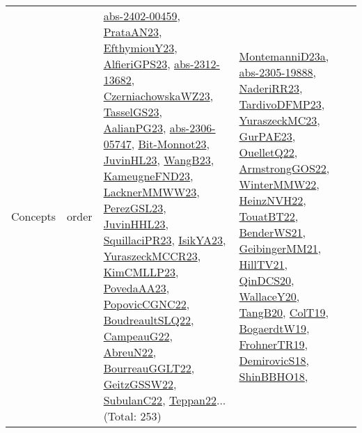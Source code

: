 {\begin{longtable}{lp{3cm}>{\raggedright}p{6cm}>{\raggedright}p{6cm}p{8cm}}
Concepts & order & \href{articles/abs-2402-00459.pdf}{abs-2402-00459}\cite{abs-2402-00459}, \href{articles/PrataAN23.pdf}{PrataAN23}\cite{PrataAN23}, \href{papers/EfthymiouY23.pdf}{EfthymiouY23}\cite{EfthymiouY23}, \href{articles/AlfieriGPS23.pdf}{AlfieriGPS23}\cite{AlfieriGPS23}, \href{articles/abs-2312-13682.pdf}{abs-2312-13682}\cite{abs-2312-13682}, \href{articles/CzerniachowskaWZ23.pdf}{CzerniachowskaWZ23}\cite{CzerniachowskaWZ23}, \href{papers/TasselGS23.pdf}{TasselGS23}\cite{TasselGS23}, \href{papers/AalianPG23.pdf}{AalianPG23}\cite{AalianPG23}, \href{articles/abs-2306-05747.pdf}{abs-2306-05747}\cite{abs-2306-05747}, \href{papers/Bit-Monnot23.pdf}{Bit-Monnot23}\cite{Bit-Monnot23}, \href{papers/JuvinHL23.pdf}{JuvinHL23}\cite{JuvinHL23}, \href{papers/WangB23.pdf}{WangB23}\cite{WangB23}, \href{papers/KameugneFND23.pdf}{KameugneFND23}\cite{KameugneFND23}, \href{articles/LacknerMMWW23.pdf}{LacknerMMWW23}\cite{LacknerMMWW23}, \href{papers/PerezGSL23.pdf}{PerezGSL23}\cite{PerezGSL23}, \href{papers/JuvinHHL23.pdf}{JuvinHHL23}\cite{JuvinHHL23}, \href{papers/SquillaciPR23.pdf}{SquillaciPR23}\cite{SquillaciPR23}, \href{articles/IsikYA23.pdf}{IsikYA23}\cite{IsikYA23}, \href{articles/YuraszeckMCCR23.pdf}{YuraszeckMCCR23}\cite{YuraszeckMCCR23}, \href{papers/KimCMLLP23.pdf}{KimCMLLP23}\cite{KimCMLLP23}, \href{papers/PovedaAA23.pdf}{PovedaAA23}\cite{PovedaAA23}, \href{papers/PopovicCGNC22.pdf}{PopovicCGNC22}\cite{PopovicCGNC22}, \href{papers/BoudreaultSLQ22.pdf}{BoudreaultSLQ22}\cite{BoudreaultSLQ22}, \href{articles/CampeauG22.pdf}{CampeauG22}\cite{CampeauG22}, \href{articles/AbreuN22.pdf}{AbreuN22}\cite{AbreuN22}, \href{articles/BourreauGGLT22.pdf}{BourreauGGLT22}\cite{BourreauGGLT22}, \href{papers/GeitzGSSW22.pdf}{GeitzGSSW22}\cite{GeitzGSSW22}, \href{articles/SubulanC22.pdf}{SubulanC22}\cite{SubulanC22}, \href{papers/Teppan22.pdf}{Teppan22}\cite{Teppan22}... (Total: 253) & \href{articles/MontemanniD23a.pdf}{MontemanniD23a}\cite{MontemanniD23a}, \href{articles/abs-2305-19888.pdf}{abs-2305-19888}\cite{abs-2305-19888}, \href{articles/NaderiRR23.pdf}{NaderiRR23}\cite{NaderiRR23}, \href{papers/TardivoDFMP23.pdf}{TardivoDFMP23}\cite{TardivoDFMP23}, \href{papers/YuraszeckMC23.pdf}{YuraszeckMC23}\cite{YuraszeckMC23}, \href{articles/GurPAE23.pdf}{GurPAE23}\cite{GurPAE23}, \href{papers/OuelletQ22.pdf}{OuelletQ22}\cite{OuelletQ22}, \href{papers/ArmstrongGOS22.pdf}{ArmstrongGOS22}\cite{ArmstrongGOS22}, \href{papers/WinterMMW22.pdf}{WinterMMW22}\cite{WinterMMW22}, \href{articles/HeinzNVH22.pdf}{HeinzNVH22}\cite{HeinzNVH22}, \href{papers/TouatBT22.pdf}{TouatBT22}\cite{TouatBT22}, \href{papers/BenderWS21.pdf}{BenderWS21}\cite{BenderWS21}, \href{papers/GeibingerMM21.pdf}{GeibingerMM21}\cite{GeibingerMM21}, \href{papers/HillTV21.pdf}{HillTV21}\cite{HillTV21}, \href{articles/QinDCS20.pdf}{QinDCS20}\cite{QinDCS20}, \href{articles/WallaceY20.pdf}{WallaceY20}\cite{WallaceY20}, \href{papers/TangB20.pdf}{TangB20}\cite{TangB20}, \href{papers/ColT19.pdf}{ColT19}\cite{ColT19}, \href{papers/BogaerdtW19.pdf}{BogaerdtW19}\cite{BogaerdtW19}, \href{papers/FrohnerTR19.pdf}{FrohnerTR19}\cite{FrohnerTR19}, \href{papers/DemirovicS18.pdf}{DemirovicS18}\cite{DemirovicS18}, \href{articles/ShinBBHO18.pdf}{ShinBBHO18}\cite{ShinBBHO18}, 
\end{longtable}}
